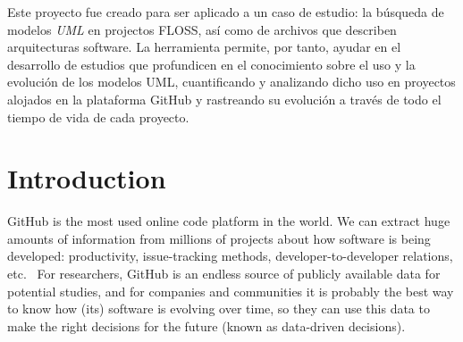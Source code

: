 \documentclass[a4paper, 12pt]{book}
\begin{document}
Este proyecto fue creado para ser aplicado a un caso de estudio: la búsqueda de modelos \emph{UML} en projectos FLOSS, así como de archivos que describen arquitecturas software.
La herramienta permite, por tanto, ayudar en el desarrollo de estudios que profundicen en el conocimiento sobre el uso y la evolución de los modelos UML,
cuantificando y analizando dicho uso en proyectos alojados en la plataforma GitHub y rastreando su evolución a través de
todo el tiempo de vida de cada proyecto.


\tableofcontents
\cleardoublepage
\listoffigures %


\cleardoublepage
\chapter{Introduction}
\label{sec:intro} %
GitHub is the most used online code platform in the world. We can extract huge amounts of information from millions of projects
about how software is being developed: productivity, issue-tracking methods, developer-to-developer relations, etc.~\cite{robles2006beyond}
For researchers, GitHub is an endless source of publicly available data for potential studies, and for companies and communities it
is probably the best way to know how (its) software is evolving over time, so they can use this data to make the right decisions
for the future (known as data-driven decisions).
\end{document}
